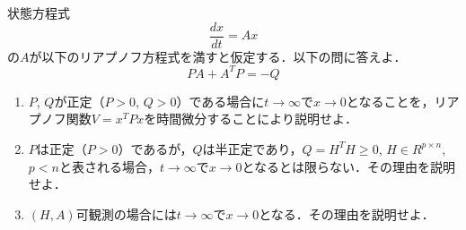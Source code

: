 \item
状態方程式
\[
	\frac{dx}{dt}= Ax
\]
の$A$が以下のリアプノフ方程式を満すと仮定する．以下の問に答えよ．
\[
	PA + A^T P = -Q
\]
\begin{enumerate}
\item 
$P$, $Q$が正定（$P>0$, $Q>0$）である場合に$t \rightarrow \infty$で$x \rightarrow 0$となることを，リアプノフ関数$V=x^T P x$を時間微分することにより説明せよ．
\vspace{9cm}

\item
$P$は正定（$P>0$）であるが，$Q$は半正定であり，$Q=H^T H \geq 0$, $H \in R^{p \times n}$, $p < n$と表される場合，$t \rightarrow \infty$で$x \rightarrow 0$となるとは限らない．その理由を説明せよ．
\vspace{6cm}

\item
$(H,A)$可観測の場合には$t \rightarrow \infty$で$x \rightarrow 0$となる．その理由を説明せよ．
\end{enumerate}


